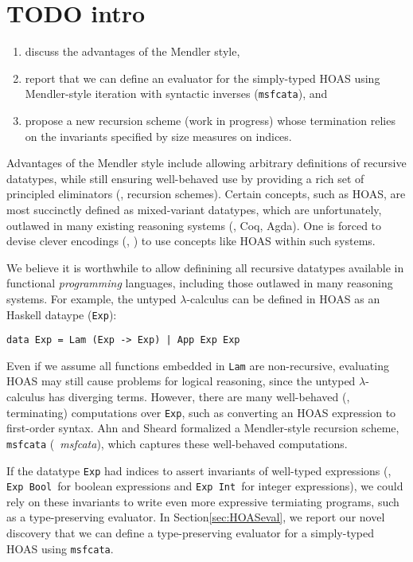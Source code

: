 \section{TODO intro}\label{sec:intro}
\begin{enumerate}
	\item discuss the advantages of the Mendler style,
	\item report that we can define an evaluator for the simply-typed HOAS
		using Mendler-style iteration with syntactic inverses
		(\lstinline{msfcata}), and
	\item propose a new recursion scheme (work in progress) whose
		termination relies on the invariants specified by
		size measures on indices.
\end{enumerate}



Advantages of the Mendler style include allowing arbitrary definitions of
recursive datatypes, while still ensuring well-behaved use by providing
a rich set of principled eliminators (\ie, recursion schemes).
Certain concepts, such as HOAS, are most succinctly defined as
mixed-variant datatypes, which are unfortunately, outlawed in many existing
reasoning systems (\eg, Coq, Agda). One is forced to devise clever encodings
(\eg, \cite{PHOAS}) to use concepts like HOAS within such systems.

We believe it is worthwhile to allow definining all recursive datatypes
available in functional \emph{programming} languages, including those outlawed
in many reasoning systems. For example, the untyped $\lambda$-calculus can be
defined in HOAS as an Haskell dataype (\lstinline{Exp}):
\begin{lstlisting}
data Exp = Lam (Exp -> Exp) | App Exp Exp
\end{lstlisting}
Even if we assume all functions embedded in \lstinline{Lam} are non-recursive,
evaluating HOAS may still cause problems for logical reasoning, since
the untyped $\lambda$-calculus has diverging terms. However, there are many
well-behaved (\ie, terminating) computations over \lstinline{Exp}, such as
converting an HOAS expression to first-order syntax.
Ahn and Sheard \cite{AhnShe11} formalized a Mendler-style recursion scheme,
\lstinline{msfcata}  (\aka\ \textit{msfcata}), which captures these
well-behaved computations.

If the datatype \lstinline{Exp} had indices to assert invariants of
well-typed expressions (\eg, \lstinline{Exp Bool}\, for boolean expressions
and \lstinline{Exp Int}\, for integer expressions), we could rely on these
invariants to write even more expressive termiating programs, such as
a type-preserving evaluator. In Section\;\ref{sec:HOASeval}, we report
our novel discovery that we can define a type-preserving evaluator for
a simply-typed HOAS using \lstinline{msfcata}.

